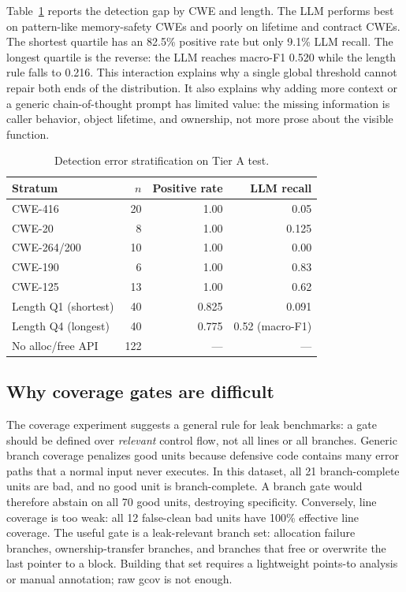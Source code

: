 \documentclass[conference]{IEEEtran}
\begin{document}
Table~\ref{tab:strata} reports the detection gap by CWE and length. The LLM performs best on pattern-like memory-safety CWEs and poorly on lifetime and contract CWEs. The shortest quartile has an 82.5\% positive rate but only 9.1\% LLM recall. The longest quartile is the reverse: the LLM reaches macro-F1 0.520 while the length rule falls to 0.216. This interaction explains why a single global threshold cannot repair both ends of the distribution. It also explains why adding more context or a generic chain-of-thought prompt has limited value: the missing information is caller behavior, object lifetime, and ownership, not more prose about the visible function.

\begin{table}[t]
\centering
\caption{Detection error stratification on Tier A test.}
\label{tab:strata}
\footnotesize
\setlength{\tabcolsep}{3pt}
\begin{tabular}{@{}lrrr@{}}
\toprule
Stratum & $n$ & Positive rate & LLM recall \\
\midrule
CWE-416 & 20 & 1.00 & 0.05 \\
CWE-20 & 8 & 1.00 & 0.125 \\
CWE-264/200 & 10 & 1.00 & 0.00 \\
CWE-190 & 6 & 1.00 & 0.83 \\
CWE-125 & 13 & 1.00 & 0.62 \\
Length Q1 (shortest) & 40 & 0.825 & 0.091 \\
Length Q4 (longest) & 40 & 0.775 & 0.52 (macro-F1) \\
No alloc/free API & 122 & --- & --- \\
\bottomrule
\end{tabular}
\end{table}

\subsection{Why coverage gates are difficult}

The coverage experiment suggests a general rule for leak benchmarks: a gate should be defined over \emph{relevant} control flow, not all lines or all branches. Generic branch coverage penalizes good units because defensive code contains many error paths that a normal input never executes. In this dataset, all 21 branch-complete units are bad, and no good unit is branch-complete. A branch gate would therefore abstain on all 70 good units, destroying specificity. Conversely, line coverage is too weak: all 12 false-clean bad units have 100\% effective line coverage. The useful gate is a leak-relevant branch set: allocation failure branches, ownership-transfer branches, and branches that free or overwrite the last pointer to a block. Building that set requires a lightweight points-to analysis or manual annotation; raw gcov is not enough.
\end{document}
